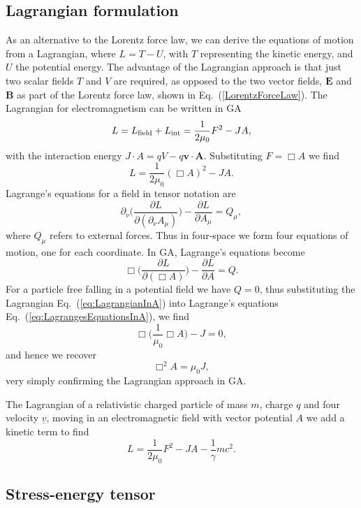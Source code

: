 \documentclass[12pt,aps,prb,preprint]{revtex4}   %
\newcommand{\be}{\begin{equation}}
\newcommand{\ee}{\end{equation}}
\begin{document}
\subsection{Lagrangian formulation}

As an alternative to the Lorentz force law, we can derive the equations of motion from a Lagrangian, where $ L = T - U $, with $ T $ representing the kinetic energy, and $ U $ the potential energy.  The advantage of the Lagrangian approach is that just two scalar fields $ T $ and $ V $ are required, as opposed to the two vector fields, $ \textbf{E} $ and $ \textbf{B} $ as part of the Lorentz force law, shown in Eq.~(\ref{LorentzForceLaw}).
The Lagrangian for electromagnetism can be written in GA
\be
L = L_{\rm{field}}+L_{\rm{int}} =  \frac{1}{2 \mu_0} F^2 -  J A ,
\ee
with the interaction energy $ J \cdot A = q V - q \textbf{v} \cdot \textbf{A} $.
Substituting $ F = \Box A $ we find
\be \label{eq:LagrangianInA}
L =  \frac{1}{2 \mu_0} (\Box A)^2 -  J A.
\ee
Lagrange's equations for a field in tensor notation are
\be
\partial_{\nu} \Big ( \frac{\partial L}{\partial ( \partial_{\nu} A_{\mu})}\Big ) - \frac{\partial L}{\partial A_{\mu}} = Q_{\mu},
\ee
where $ Q_{\mu} $ refers to external forces.  Thus in four-space we form four equations of motion, one for each coordinate. In GA, Lagrange's equations become 
\be \label{eq:LagrangesEquationsInA}
\Box \Big ( \frac{\partial L}{\partial ( \Box A)}\Big ) - \frac{\partial L}{\partial A} = Q.
\ee
For a particle free falling in a potential field we have $ Q = 0 $, thus substituting the Lagrangian Eq.~(\ref{eq:LagrangianInA}) into Lagrange's equations Eq.~(\ref{eq:LagrangesEquationsInA}), we find
\be
\Box \Big (\frac{1}{\mu_0} \Box A \Big ) - J = 0 ,
\ee
and hence we recover
\be
\Box^2  A = \mu_0 J ,
\ee
very simply confirming the Lagrangian approach in GA.

The Lagrangian of a relativistic charged particle of mass $ m $, charge $ q $ and four velocity $ \underline{v} $, moving in an electromagnetic field with vector potential $ A $ we add a kinetic term to find
\be
L =  \frac{1}{2 \mu_0} F^2 - J A - \frac{1}{\gamma} m c^2 .
\ee


\subsection{Stress-energy tensor}
\end{document}
